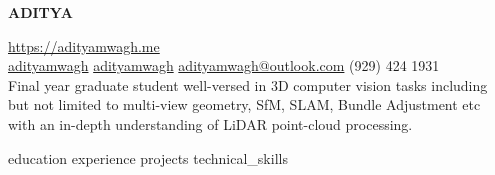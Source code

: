\documentclass[a4paper]{article}
\begin{document}
\begin{center}
	\vspace*{-10pt}
	\begin{center}
		\uppercase{\Huge \bfseries Aditya }
	\end{center}
	\vspace{4pt}
	\href{https://adityamwagh.me}{https://adityamwagh.me} \\

	\vspace{4pt}
	\faLinkedin\space{} \href{https://linkedin.com/in/adityamwagh}{adityamwagh} \space{}
	\faGithub{} \space{} \href{https://github.com/adityamwagh}{adityamwagh} \space{}
	\faAt{} \space{} \href{mailto:adityamwagh@outlook.com}{adityamwagh@outlook.com} \space{}
	\faPhone{} \space{} (929) 424 1931 \\

	\vspace{4pt}
	Final year graduate student well-versed in 3D computer vision tasks including but not limited to multi-view geometry,
	SfM, SLAM, Bundle Adjustment etc with an in-depth understanding of LiDAR point-cloud processing.
\end{center}

\justifying{}
{education}
{experience}
{projects}
{technical_skills}

\end{document}
